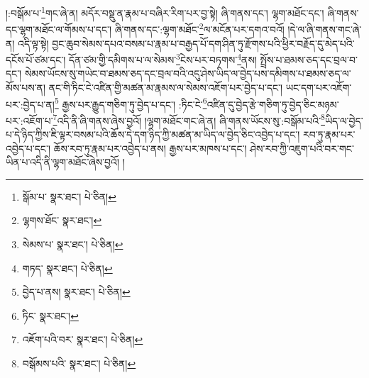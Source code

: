 །:བསྒོམ་པ་\footnote{སྒོམ་པ་  སྣར་ཐང་།  པེ་ཅིན། }གང་ཞེ་ན། མདོར་བསྡུ་ན་རྣམ་པ་བཞིར་རིག་པར་བྱ་སྟེ། ཞི་གནས་དང་། ལྷག་མཐོང་དང་། ཞི་གནས་དང་ལྷག་མཐོང་ལ་གོམས་པ་དང་། ཞི་གནས་དང་:ལྷག་མཐོང་\footnote{ལྷགས་ཐོང་  སྣར་ཐང་། }ལ་མངོན་པར་དགའ་བའོ། །དེ་ལ་ཞི་གནས་གང་ཞེ་ན། འདི་ལྟ་སྟེ། བྱང་ཆུབ་སེམས་དཔའ་བསམ་པ་རྣམ་པ་བརྒྱད་པོ་དག་ཤིན་ཏུ་རྫོགས་པའི་ཕྱིར་བརྗོད་དུ་མེད་པའི་དངོས་པོ་ཙམ་དང་། དོན་ཙམ་གྱི་དམིགས་པ་ལ་སེམས་\footnote{སེམས་པ་  སྣར་ཐང་།  པེ་ཅིན། }ངེས་པར་བཏགས་\footnote{གཏད་  སྣར་ཐང་།  པེ་ཅིན། }ནས། སྤྲོས་པ་ཐམས་ཅད་དང་བྲལ་བ་དང་། སེམས་ཡོངས་སུ་གཡེང་བ་ཐམས་ཅད་དང་བྲལ་བའི་འདུ་ཤེས་ཡིད་ལ་བྱེད་པས་དམིགས་པ་ཐམས་ཅད་ལ་མོས་པས་ན། ནང་གི་ཏིང་ངེ་འཛིན་གྱི་མཚན་མ་རྣམས་ལ་སེམས་འཇོག་པར་བྱེད་པ་དང་། ཡང་དག་པར་འཇོག་པར་:བྱེད་པ་ན།\footnote{བྱེད་པ་ནས།  སྣར་ཐང་།  པེ་ཅིན། } རྒྱས་པར་རྒྱུད་གཅིག་ཏུ་བྱེད་པ་དང་། :ཏིང་ངེ་\footnote{ཏིང་  སྣར་ཐང་། }འཛིན་དུ་བྱེད་རྩེ་གཅིག་ཏུ་བྱེད་ཅིང་མཉམ་པར་:འཇོག་པ་\footnote{འཇོག་པའི་བར་  སྣར་ཐང་།  པེ་ཅིན། }འདི་ནི་ཞི་གནས་ཞེས་བྱའོ། །ལྷག་མཐོང་གང་ཞེ་ན། ཞི་གནས་ཡོངས་སུ་:བསྒོམ་པའི་\footnote{བསྒོམས་པའི་  སྣར་ཐང་།  པེ་ཅིན། }ཡིད་ལ་བྱེད་པ་དེ་ཉིད་ཀྱིས་ཇི་ལྟར་བསམ་པའི་ཆོས་དེ་དག་ཉིད་ཀྱི་མཚན་མ་ཡིད་ལ་བྱེད་ཅིང་འབྱེད་པ་དང་། རབ་ཏུ་རྣམ་པར་འབྱེད་པ་དང་། ཆོས་རབ་ཏུ་རྣམ་པར་འབྱེད་པ་ནས། རྒྱས་པར་མཁས་པ་དང་། ཤེས་རབ་ཀྱི་འཇུག་པའི་བར་གང་ཡིན་པ་འདི་ནི་ལྷག་མཐོང་ཞེས་བྱའོ། །
